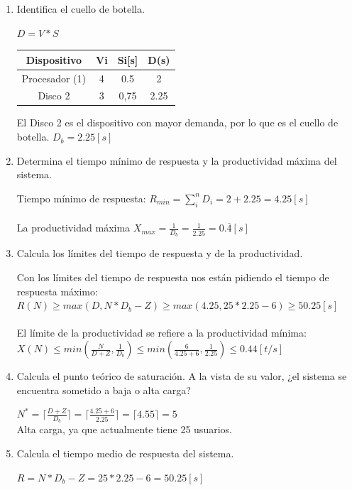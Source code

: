 \begin{enumerate}
    \item Identifica el cuello de botella.
    \begin{tcolorbox}[colback=white,colframe=cyan!50!black,fonttitle=\bfseries]
    $D=V*S$
        \begin{table}[H]\centering
        \begin{tabular}{|c|c|c|c|}\hline
        \textbf{Dispositivo}    & \textbf{Vi} & \textbf{Si[s]} & \textbf{D(s)}\\ \hline
        Procesador (1) & 4  & 0.5  & 2   \\ \hline
        Disco 2        & 3  & 0,75  & 2.25  \\ \hline
        \end{tabular}\end{table}
        El Disco 2 es el dispositivo con mayor demanda, por lo que es el cuello de botella.
        $D_b = 2.25[s]$
    \end{tcolorbox}
    \item Determina el tiempo mínimo de respuesta y la productividad máxima del sistema.
    \begin{tcolorbox}[colback=white,colframe=cyan!50!black,fonttitle=\bfseries]
    Tiempo mínimo de respuesta: $R_{min}=\sum_i^nD_i=2+2.25=4.25[s]$\\\\
    La productividad máxima $X_{max} = \frac{1}{D_b}=\frac{1}{2.25}=0.\overline{4}[s]$
    \end{tcolorbox}
    \item Calcula los límites del tiempo de respuesta y de la productividad.
    \begin{tcolorbox}[colback=white,colframe=cyan!50!black,fonttitle=\bfseries]
    Con los límites del tiempo de respuesta nos están pidiendo el tiempo de respuesta máximo: \\$R(N)\geq max(D, N*D_b-Z) \geq max(4.25, 25*2.25-6) \geq 50.25[s]$\\\\
    El límite de la productividad se refiere a la productividad mínima: \\
    $X(N)\leq min(\frac{N}{D+Z}, \frac{1}{D_b})\leq min(\frac{6}{4.25+6}, \frac{1}{2.25}) \leq 0.44 [t/s]$
    \end{tcolorbox}
    \item Calcula el punto teórico de saturación. A la vista de su valor, ¿el sistema se encuentra sometido a baja o alta carga?
    \begin{tcolorbox}[colback=white,colframe=cyan!50!black,fonttitle=\bfseries]
    $N^* = \lceil \frac{D+Z}{D_b} \rceil = \lceil \frac{4.25+6}{2.25} \rceil = \lceil 4.55 \rceil = 5$\\
    Alta carga, ya que actualmente tiene 25 usuarios.
    \end{tcolorbox}
    \item Calcula el tiempo medio de respuesta del sistema.
    \begin{tcolorbox}[colback=white,colframe=cyan!50!black,fonttitle=\bfseries]
    $R=N*D_b - Z = 25*2.25-6=50.25[s]$
    \end{tcolorbox}
\end{enumerate}

